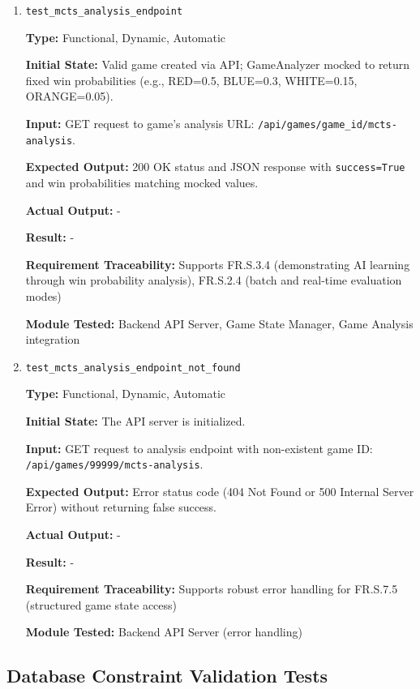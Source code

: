 \documentclass[12pt, titlepage]{article}
\begin{document}
\begin{enumerate}

\item \texttt{test\_mcts\_analysis\_endpoint}

\textbf{Type:} Functional, Dynamic, Automatic

\textbf{Initial State:} Valid game created via API; GameAnalyzer mocked to return fixed win probabilities (e.g., RED=0.5, BLUE=0.3, WHITE=0.15, ORANGE=0.05).

\textbf{Input:} GET request to game's analysis URL: \texttt{/api/games/{game\_id}/mcts-analysis}.

\textbf{Expected Output:} 200 OK status and JSON response with \texttt{success=True} and win probabilities matching mocked values.

\textbf{Actual Output:} -

\textbf{Result:} -

\textbf{Requirement Traceability:} Supports FR.S.3.4 (demonstrating AI learning through win probability analysis), FR.S.2.4 (batch and real-time evaluation modes)

\textbf{Module Tested:} Backend API Server, Game State Manager, Game Analysis integration


\item \texttt{test\_mcts\_analysis\_endpoint\_not\_found}

\textbf{Type:} Functional, Dynamic, Automatic

\textbf{Initial State:} The API server is initialized.

\textbf{Input:} GET request to analysis endpoint with non-existent game ID: \texttt{/api/games/99999/mcts-analysis}.

\textbf{Expected Output:} Error status code (404 Not Found or 500 Internal Server Error) without returning false success.

\textbf{Actual Output:} -

\textbf{Result:} -

\textbf{Requirement Traceability:} Supports robust error handling for FR.S.7.5 (structured game state access)

\textbf{Module Tested:} Backend API Server (error handling)

\end{enumerate}

\subsection{Database Constraint Validation Tests}
\end{document}
